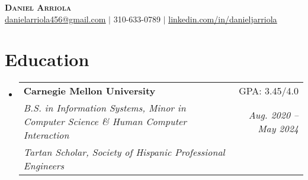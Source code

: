 \documentclass[letterpaper,11pt]{article}
\makeatletter
\newcommand{\resumeEducationSubheading}[6]{
  \vspace{-2pt}\item
    \begin{tabular*}{0.97\textwidth}[t]{l@{\extracolsep{\fill}}r}
      \textbf{#1} & #2 \\
      \textit{\small#3} & \textit{\small #4} \\
      \textit{\small#5} & \textit{\small #6} \\
    \end{tabular*}\vspace{-7pt}
}
\newcommand{\resumeSubHeadingListStart}{\begin{itemize}[leftmargin=0.15in, label={}]}
\newcommand{\resumeSubHeadingListEnd}{\end{itemize}}
\makeatother
\begin{document}

\begin{center}
    \textbf{\Huge \scshape Daniel Arriola} \\ \vspace{1pt}
    \href{mailto:danielarriola456@gmail.com}{\underline{danielarriola456@gmail.com}} $|$ 
    \small 310-633-0789 $|$
    \href{https://www.linkedin.com/in/danieljarriola}{\underline{linkedin.com/in/danieljarriola}}
\end{center}


\section{Education}
    \resumeSubHeadingListStart
        \resumeEducationSubheading
        {Carnegie Mellon University}{GPA: 3.45/4.0}
        {B.S. in Information Systems, Minor in Computer Science \& Human Computer Interaction}{Aug. 2020 -- May 2024}
        {Tartan Scholar, Society of Hispanic Professional Engineers}{}
    \resumeSubHeadingListEnd


\end{document}
